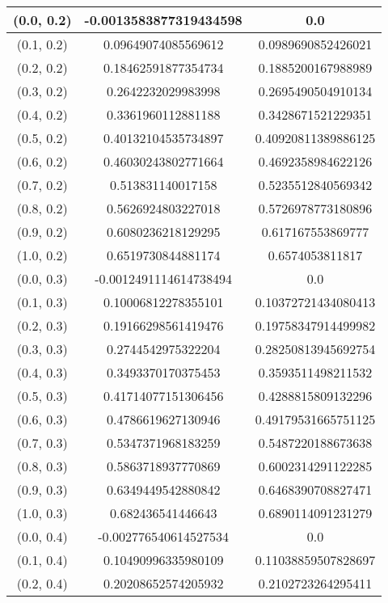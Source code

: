 \begin{table}[H]
\begin{tabular}{|c|c|c|}
\hline
(0.0, 0.2) & -0.0013583877319434598 & 0.0 \\
\hline
(0.1, 0.2) & 0.09649074085569612 & 0.0989690852426021 \\
\hline
(0.2, 0.2) & 0.18462591877354734 & 0.1885200167988989 \\
\hline
(0.3, 0.2) & 0.2642232029983998 & 0.2695490504910134 \\
\hline
(0.4, 0.2) & 0.3361960112881188 & 0.3428671521229351 \\
\hline
(0.5, 0.2) & 0.40132104535734897 & 0.40920811389886125 \\
\hline
(0.6, 0.2) & 0.46030243802771664 & 0.4692358984622126 \\
\hline
(0.7, 0.2) & 0.513831140017158 & 0.5235512840569342 \\
\hline
(0.8, 0.2) & 0.5626924803227018 & 0.5726978773180896 \\
\hline
(0.9, 0.2) & 0.6080236218129295 & 0.617167553869777 \\
\hline
(1.0, 0.2) & 0.6519730844881174 & 0.6574053811817 \\
\hline
\hline
(0.0, 0.3) & -0.0012491114614738494 & 0.0 \\
\hline
(0.1, 0.3) & 0.10006812278355101 & 0.10372721434080413 \\
\hline
(0.2, 0.3) & 0.19166298561419476 & 0.19758347914499982 \\
\hline
(0.3, 0.3) & 0.2744542975322204 & 0.28250813945692754 \\
\hline
(0.4, 0.3) & 0.3493370170375453 & 0.3593511498211532 \\
\hline
(0.5, 0.3) & 0.41714077151306456 & 0.4288815809132296 \\
\hline
(0.6, 0.3) & 0.4786619627130946 & 0.49179531665751125 \\
\hline
(0.7, 0.3) & 0.5347371968183259 & 0.5487220188673638 \\
\hline
(0.8, 0.3) & 0.5863718937770869 & 0.6002314291122285 \\
\hline
(0.9, 0.3) & 0.6349449542880842 & 0.6468390708827471 \\
\hline
(1.0, 0.3) & 0.682436541446643 & 0.6890114091231279 \\
\hline
\hline
(0.0, 0.4) & -0.002776540614527534 & 0.0 \\
\hline
(0.1, 0.4) & 0.10490996335980109 & 0.11038859507828697 \\
\hline
(0.2, 0.4) & 0.20208652574205932 & 0.2102723264295411 \\

\end{tabular}
\end{table}

